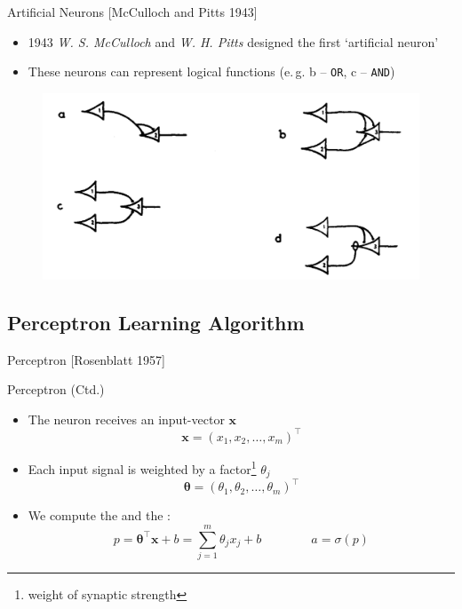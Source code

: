 \begin{frame}{Artificial Neurons [McCulloch and Pitts 1943]}{}
	\begin{itemize}
		\item 1943 \textit{W. S. McCulloch} and \textit{W. H. Pitts} designed the first `artificial neuron'
		\item These neurons can represent logical functions (e.\,g. b -- \texttt{OR}, c -- \texttt{AND})
	\end{itemize}
	
	\begin{figure}
		\centering
		\includegraphics[scale=0.25]{10_deep_learning/02_img/mcculloch_pitts}
	\end{figure}
\end{frame}


\subsection{Perceptron Learning Algorithm}

\begin{frame}{Perceptron [Rosenblatt 1957]}{}
	
\end{frame}


\begin{frame}{Perceptron (Ctd.)}{}
	\begin{itemize}
		\item The neuron receives an input-vector $\bm{x}$
		\begin{equation*}
			\bm{x} = (x_1, x_2, \dots, x_m)^{\intercal}
		\end{equation*}
		\item Each input signal is weighted by a factor\footnote[frame]{weight of synaptic strength} $\theta_j$
		\begin{equation*}
			\bm{\theta} = (\theta_1, \theta_2, \dots, \theta_m)^{\intercal}
		\end{equation*}
		\item We compute the  and the :
		\begin{equation}
			p = \bm{\theta}^{\intercal} \bm{x} + b = \sum_{j=1}^m \theta_j x_j + b \qquad\qquad
			a = \sigma(p)
		\end{equation}
	\end{itemize}
\end{frame}


